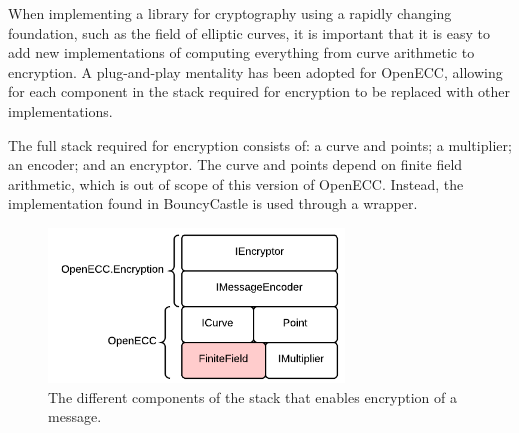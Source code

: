 When implementing a library for cryptography using a rapidly changing foundation, such as the field
of elliptic curves, it is important that it is easy to add new implementations of computing everything
from curve arithmetic to encryption. A plug-and-play mentality has been adopted for OpenECC, allowing
for each component in the stack required for encryption to be replaced with other implementations.

The full stack required for encryption consists of: a curve and points; a multiplier; an encoder; and
an encryptor. The curve and points depend on finite field arithmetic, which is out of scope of this
version of OpenECC. Instead, the implementation found in BouncyCastle is used through a wrapper.

\begin{figure}[htb]
	\centering
	\includegraphics[width=0.7\textwidth]{implementation/components}
	\caption{The different components of the stack that enables encryption of a message.}
\end{figure}